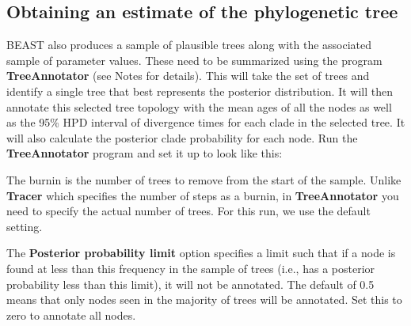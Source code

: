 \documentclass[12pt]{article}
\begin{document}
\medskip{}

\subsection*{Obtaining an estimate of the phylogenetic tree}

BEAST also produces a sample of plausible trees along with the associated sample of parameter values. 
These need to be summarized using the program {\bf TreeAnnotator} (see Notes for details). This will take the set of trees and identify a single tree that best represents the posterior distribution. It will then annotate this selected tree topology with the mean ages of all the
nodes as well as the 95\% HPD interval of divergence times for each clade in the selected tree. It will also calculate the posterior clade probability for each
node. Run the {\bf TreeAnnotator} program and set it up to look like this:

\medskip{}


\medskip{}

The burnin is the number of trees to remove from the start of the sample. Unlike {\bf Tracer} which specifies the number of
steps as a burnin, in {\bf TreeAnnotator} you need to specify the actual number of trees. For this run, we use the default setting.

The {\bf Posterior probability limit} option specifies a limit such that if a node is found at less than this frequency in the sample
of trees (i.e., has a posterior probability less than this limit), it will not be annotated. The default of 0.5 means that only nodes
seen in the majority of trees will be annotated. Set this to zero to annotate all nodes.
\end{document}
